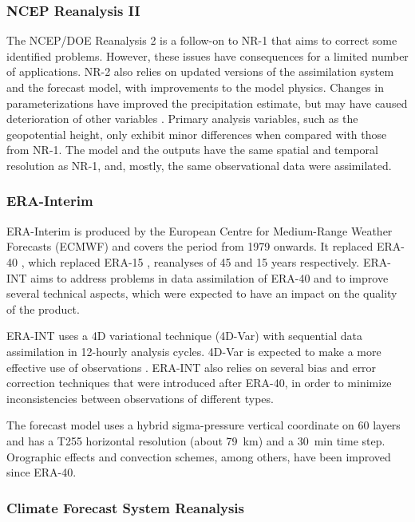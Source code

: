 \documentclass{ametsoc}
\begin{document}
	
	\subsubsection{NCEP Reanalysis II}
	
	The NCEP/DOE Reanalysis 2 \citep[NR-2 --][]{Kanamitsu2002} is a follow-on to NR-1 that aims to correct some identified problems. However, these issues have consequences for a limited number of applications. NR-2 also relies on updated versions of the assimilation system and the forecast model, with improvements to the model physics. Changes in parameterizations have improved the precipitation estimate, but may have caused deterioration of other variables \citep{Kistler2001, Kanamitsu2002}. Primary analysis variables, such as the geopotential height, only exhibit minor differences when compared with those from NR-1. The model and the outputs have the same spatial and temporal resolution as NR-1, and, mostly, the same observational data were assimilated.
	
	
	\subsubsection{ERA-Interim}
	
	ERA-Interim \citep[ERA-INT --][]{Dee2011a} is produced by the European Centre for Medium-Range Weather Forecasts (ECMWF) and covers the period from 1979 onwards. It replaced ERA-40 \citep{Uppala2005}, which replaced ERA-15 \citep{Gibson1997}, reanalyses of 45 and 15 years respectively. ERA-INT aims to address problems in data assimilation of ERA-40 and to improve several technical aspects, which were expected to have an impact on the quality of the product.
	
	ERA-INT uses a 4D variational technique (4D-Var) with sequential data assimilation in 12-hourly analysis cycles. 4D-Var is expected to make a more effective use of observations \citep{Dee2011a}. ERA-INT also relies on several bias and error correction techniques that were introduced after ERA-40, in order to minimize inconsistencies between observations of different types.
	
	The forecast model uses a hybrid sigma-pressure vertical coordinate on 60 layers and has a T255 horizontal resolution (about 79~km) and a 30~min time step. Orographic effects and convection schemes, among others, have been improved since ERA-40.
	
	
	\subsubsection{Climate Forecast System Reanalysis}
	
\end{document}
